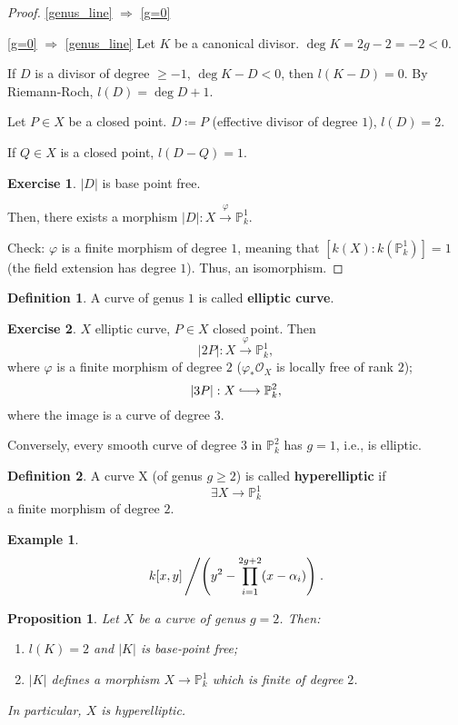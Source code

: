 \documentclass[12pt]{article}
\newtheorem*{proposition}{Proposition}
\theoremstyle{definition}
\newtheorem*{definition}{Definition}
\newtheorem*{exercise}{Exercise}
\newtheorem*{example}{Example}
\theoremstyle{remark}
\begin{document}
\begin{proof}
\ref{genus_line} $\Rightarrow$ \ref{g=0} \checkmark

\ref{g=0} $\Rightarrow$ \ref{genus_line} Let $K$ be a canonical divisor. $\deg K=2g-2=-2<0$.

If $D$ is a divisor of degree $\geq-1$, $\deg K-D<0$, then $l(K-D)=0$. By Riemann-Roch, $l(D)=\deg D+1$.

Let $P\in X$ be a closed point. $D\coloneqq P$ (effective divisor of degree $1$), $l(D)=2$.

If $Q\in X$ is a closed point, $l(D-Q)=1$.

\begin{exercise}
$|D|$ is base point free.
\end{exercise}

Then, there exists a morphism $|D|:X\xrightarrow{\varphi}\mathbb{P}_k^1$.

Check: $\varphi$ is a finite morphism of degree $1$, meaning that $[k(X):k(\mathbb{P}_k^1)]=1$ (the field extension has degree $1$). Thus, an isomorphism.
\end{proof}

\begin{definition}
A curve of genus $1$ is called \textbf{elliptic curve}.
\end{definition}

\begin{exercise}
$X$ elliptic curve, $P\in X$ closed point. Then
\[|2P|:X\overset{\varphi}{\longrightarrow}\mathbb{P}_k^1,\]
where $\varphi$ is a finite morphism of degree $2$ ($\varphi_*\mathcal{O}_X$ is locally free of rank $2$);
\[|3P|:X\lhook\joinrel\longrightarrow\mathbb{P}_k^2,\]
where the image is a curve of degree $3$.

Conversely, every smooth curve of degree $3$ in $\mathbb{P}_k^2$ has $g=1$, i.e., is elliptic.
\end{exercise}

\begin{definition}
A curve X (of genus $g\geq2$) is called \textbf{hyperelliptic} if
\[\exists X\longrightarrow\mathbb{P}_k^1\]
a finite morphism of degree $2$.
\end{definition}

\begin{example}
\[k[x,y]\left/\left(y^2-\prod_{i=1}^{2g+2}(x-\alpha_i)\right)\right..\]
\end{example}

\begin{proposition}
Let $X$ be a curve of genus $g=2$. Then:
\begin{enumerate}[label=\arabic*)]
\item $l(K)=2$ and $|K|$ is base-point free;
\item $|K|$ defines a morphism $X\rightarrow\mathbb{P}_k^1$ which is finite of degree $2$.
\end{enumerate}
In particular, $X$ is hyperelliptic.
\end{proposition}
\end{document}
